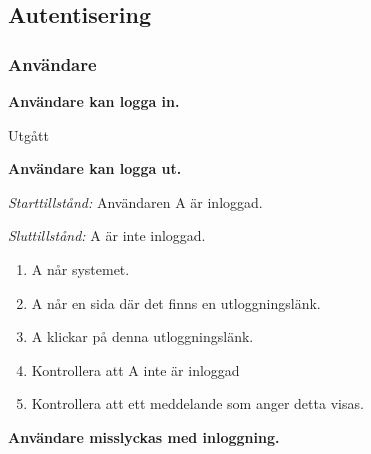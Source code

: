 \documentclass[a4paper]{article}
\begin{document}


\subsection{Autentisering}

\subsubsection{Användare}

\begin{ST}
%
\item
\textbf{Användare kan logga in.}

Utgått
%
%
%

\item
\textbf{Användare kan logga ut.}

\emph{Starttillstånd:} Användaren A är inloggad.

\emph{Sluttillstånd:} A är inte inloggad.

\begin{enumerate}
\item A når systemet.
\item A når en sida där det finns en utloggningslänk.
\item A klickar på denna utloggningslänk.
\item Kontrollera att A inte är inloggad
\item Kontrollera att ett meddelande som anger detta visas.
\end{enumerate}

\item
\textbf{Användare misslyckas med inloggning.}


\end{ST}
\end{document}
